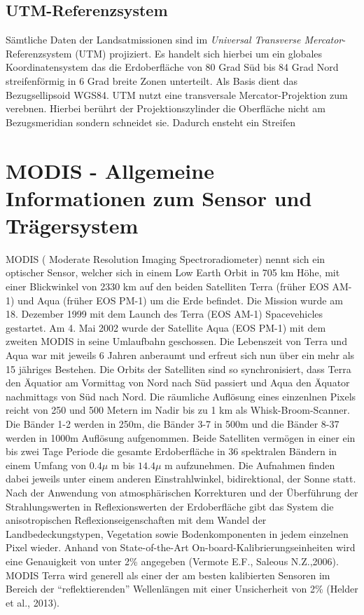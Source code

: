 \documentclass[11pt]{report}
\begin{document}
\subsection{UTM-Referenzsystem}
Sämtliche Daten der Landsatmissionen sind im \textit{Universal Transverse Mercator}-Referenzsystem (UTM) projiziert. Es handelt sich hierbei um ein globales Koordinatensystem das die Erdoberfläche von 80 Grad Süd bis 84 Grad Nord streifenförmig in 6 Grad breite Zonen unterteilt. Als Basis dient das Bezugsellipsoid WGS84. UTM nutzt eine transversale Mercator-Projektion zum verebnen. Hierbei berührt der Projektionszylinder die Oberfläche nicht am Bezugsmeridian sondern schneidet sie. Dadurch ensteht ein Streifen

\section{MODIS - Allgemeine Informationen zum Sensor und Trägersystem}


MODIS ( Moderate Resolution Imaging Spectroradiometer) nennt sich ein optischer Sensor, welcher sich in einem Low Earth Orbit in 705 km Höhe, mit einer Blickwinkel von 2330 km auf den beiden Satelliten Terra (früher EOS AM-1) und Aqua (früher EOS PM-1) um die Erde befindet. Die Mission wurde am 18. Dezember 1999 mit dem Launch des Terra (EOS AM-1) Spacevehicles gestartet. Am 4. Mai 2002 wurde der Satellite Aqua (EOS PM-1) mit dem zweiten MODIS in seine Umlaufbahn geschossen. Die Lebenszeit von Terra und Aqua war mit jeweils 6 Jahren anberaumt und erfreut sich nun über ein mehr als 15 jähriges Bestehen. Die Orbits der Satelliten sind so synchronisiert, dass Terra den Äquatior am Vormittag von Nord nach Süd passiert und Aqua den Äquator nachmittags von Süd nach Nord. Die räumliche Auflösung eines einzenlnen Pixels reicht von 250 und 500 Metern im Nadir bis zu 1 km als Whisk-Broom-Scanner. Die Bänder 1-2 werden in 250m, die Bänder 3-7 in 500m und die Bänder 8-37 werden in 1000m Auflösung aufgenommen. Beide Satelliten vermögen in einer ein bis zwei Tage Periode die gesamte Erdoberfläche in 36 spektralen Bändern in einem Umfang von $0.4\mu$ m bis $14.4\mu$ m aufzunehmen. Die Aufnahmen finden dabei jeweils unter einem anderen Einstrahlwinkel, bidirektional,  der Sonne statt. Nach der Anwendung von atmosphärischen Korrekturen und der Überführung der Strahlungswerten in Reflexionswerten der Erdoberfläche gibt das System die anisotropischen Reflexionseigenschaften mit dem Wandel der Landbedeckungstypen, Vegetation sowie Bodenkomponenten  in jedem einzelnen Pixel wieder. Anhand von State-of-the-Art On-board-Kalibrierungseinheiten wird eine Genauigkeit von unter 2\% angegeben (Vermote E.F., Saleous N.Z.,2006). MODIS Terra wird generell als einer der am besten kalibierten Sensoren im Bereich der "`reflektierenden"' Wellenlängen mit einer Unsicherheit von 2\% (Helder et al., 2013).
\newline
\end{document}
